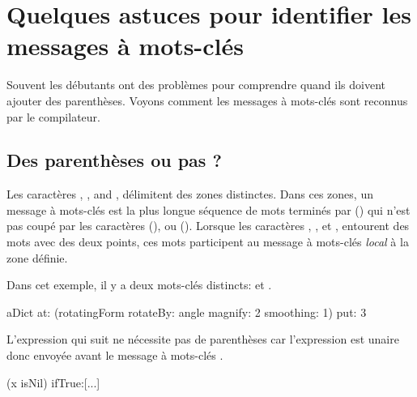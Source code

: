 \documentclass[a4paper,10pt,twoside]{book}
\begin{document}
\section{Quelques astuces pour identifier les messages à mots-clés}
Souvent les débutants ont des problèmes pour comprendre quand ils doivent ajouter des parenthèses. Voyons comment les messages à mots-clés sont reconnus par le compilateur.

\subsection{Des parenthèses ou pas ?}
Les caractères \ct{[}, \ct{]}, and \ct{(}, \ct{)} 
délimitent des zones distinctes. Dans ces zones, un message à mots-clés est la plus longue séquence de mots terminés par (\ct{:}) qui n'est pas coupé par les caractères (), ou (\ct{;}). 
Lorsque les caractères \ct{[}, \ct{]}, et \ct{(}, \ct{)} entourent des mots avec des deux points, ces mots participent au message à mots-clés \emph{local} à la zone définie.

Dans cet exemple, il y a deux mots-clés distincts:  et .

\begin{code}{}
aDict
   at: (rotatingForm 
          rotateBy: angle	
          magnify: 2 
          smoothing: 1)
   put: 3
\end{code}




L'expression qui suit ne nécessite pas de parenthèses car l'expression  est unaire donc envoyée avant le message à mots-clés \mbox{.}
\begin{code}{}
(x isNil)
   ifTrue:[...]
\end{code}
\end{document}

